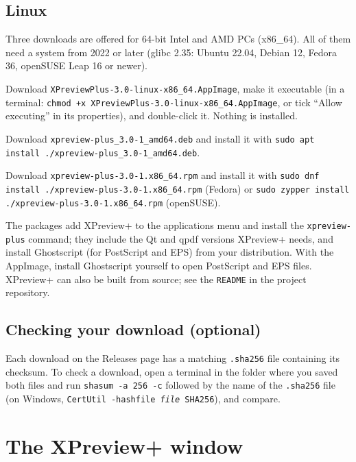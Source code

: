 \documentclass[11pt,a4paper]{article}
\newcommand{\app}{XPreview+}
\newcommand{\file}[1]{\texttt{#1}}
\begin{document}
\subsection{Linux}
Three downloads are offered for 64-bit Intel and AMD PCs (x86\_64). All of them need a system
from 2022 or later (glibc 2.35: Ubuntu 22.04, Debian 12, Fedora 36, openSUSE Leap 16 or newer).
\begin{description}[style=nextline, leftmargin=2.2em, font=\sffamily\bfseries]
  \item[AppImage (any distribution)] Download
        \file{XPreviewPlus-3.0-linux-x86\_64.AppImage}, make it executable (in a terminal:
        \texttt{chmod +x XPreviewPlus-3.0-linux-x86\_64.AppImage}, or tick ``Allow executing''
        in its properties), and double-click it. Nothing is installed.
  \item[Debian and Ubuntu] Download \file{xpreview-plus\_3.0-1\_amd64.deb} and install it
        with \texttt{sudo apt install ./xpreview-plus\_3.0-1\_amd64.deb}.
  \item[Fedora and openSUSE] Download \file{xpreview-plus-3.0-1.x86\_64.rpm} and install it
        with \texttt{sudo dnf install ./xpreview-plus-3.0-1.x86\_64.rpm} (Fedora) or
        \texttt{sudo zypper install ./xpreview-plus-3.0-1.x86\_64.rpm} (openSUSE).
\end{description}
The packages add \app{} to the applications menu and install the \texttt{xpreview-plus}
command; they include the Qt and qpdf versions \app{} needs, and install Ghostscript (for
PostScript and EPS) from your distribution. With the AppImage, install Ghostscript yourself
to open PostScript and EPS files. \app{} can also be built from source; see the \file{README}
in the project repository.

\subsection{Checking your download (optional)}
Each download on the Releases page has a matching \file{.sha256} file containing its
checksum. To check a download, open a terminal in the folder where you saved both files and run
\texttt{shasum -a 256 -c} followed by the name of the \file{.sha256} file (on Windows,
\texttt{CertUtil -hashfile \textit{file} SHA256}), and compare.

\section{The \app{} window}\label{sec:window}
\end{document}
